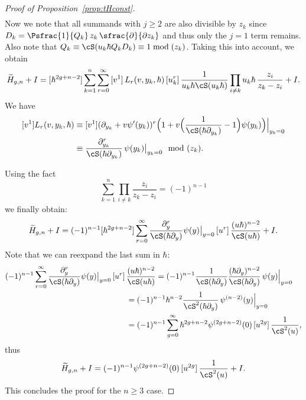 \begin{proof}[Proof of Proposition~\ref{prop:tHconst}]
\begin{multline}
\end{multline}
Now we note that all summands with $j\geq 2$ are also divisible by $z_k$ since $D_k=\Psfrac{1}{Q_k}\,z_k\,\sfrac{\partial}{\partial z_k}$ and thus only the $j=1$ term remains.
Also note that $Q_k\equiv \cS(u_k\hbar Q_kD_k)\equiv 1\bmod {(z_k)}$. Taking this into account, we obtain
\begin{equation*}
\widetilde{H}_{g,n}+I = [\hbar^{2g+n-2}]\sum\limits_{k=1}^n\sum\limits_{r=0}^\infty \,[v^1]\,L_r(v,y_k,\hbar)\,[u_k^r]\, \frac{1}{u_k\hbar \cS(u_k\hbar)}\prod\limits_{i\neq k}u_k\hbar\,\frac{z_i}{z_k-z_i} + I.
\end{equation*}
We have
\begin{equation}\label{eq:L1expr}
\begin{aligned}
{}[v^1]L_r(v,y_k,\hbar)&\equiv[v^1](\partial_{y_k}+v\psi'(y_k))^r \Bigl(1+v \Bigl(\frac1{\cS(\hbar\partial_{y_k})}-1 \Bigr)\psi(y_k) \Bigr)\Big|_{y_k=0} \\
&\equiv\frac{\partial_{y_k}^r}{\cS(\hbar \partial_{y_k})}\,\psi(y_k)\big|_{y_k=0} \mod{(z_k)}.
\end{aligned}
\end{equation}

Using the fact
\begin{equation*}
\sum\limits_{k=1}^n\prod\limits_{i\neq k} \frac{z_i}{z_k-z_i}=(-1)^{n-1}
\end{equation*}
we finally obtain:\vspace*{-5pt}
\begin{equation*}
\widetilde{H}_{g,n}+I=(-1)^{n-1}[\hbar^{2g+n-2}]\sum\limits_{r=0}^\infty \frac{\partial_{y}^r}{\cS(\hbar \partial_y)}\psi(y)\big|_{y=0} \,[u^r]\,\frac{(u\hbar)^{n-2}}{\cS(u\hbar)} + I.
\end{equation*}
Note that we can reexpand the last sum in $\hbar$:\vspace*{-5pt}
\begin{align*}\label{eq:psidertr}
(-1)^{n-1}\sum\limits_{r=0}^\infty \frac{\partial_{y}^r}{\cS(\hbar \partial_y)}\psi(y)\big|_{y=0} \,[u^r]\,&\frac{(u\hbar)^{n-2}}{\cS(u\hbar)}=(-1)^{n-1}\frac1{\cS(\hbar \partial_y)}\frac{(\hbar\partial_y)^{n-2}}{\cS(\hbar \partial_y)}\,\psi(y)\Big|_{y=0} \\
& = (-1)^{n-1}\hbar^{n-2}\frac1{\cS^2(\hbar \partial_y)}\,\psi^{(n-2)}(y)\Big|_{y=0}\\
& =(-1)^{n-1}\sum_{g=0}^\infty\hbar^{2g+n-2}\psi^{(2g+n-2)}(0)\,[u^{2g}]\,\frac1{\cS^2(u)},
\end{align*}
thus\vspace*{-5pt}
\begin{equation}\label{eq:Htildeansw}
\widetilde{H}_{g,n}+I=(-1)^{n-1}\psi^{(2g+n-2)}(0)\,[u^{2g}]\,\frac1{\cS^2(u)} + I.
\end{equation}
This concludes the proof for the $n\geq 3$ case.


\end{proof}
